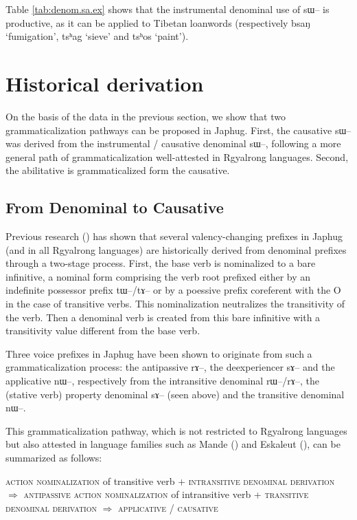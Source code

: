 \documentclass[oldfontcommands,oneside,a4paper,11pt]{article}
\newcommand{\ipa}[1]{{\phon \mbox{#1}}} %
\begin{document}
 Table \ref{tab:denom.sa.ex} shows that the instrumental   denominal use of \ipa{sɯ--} is productive, as it can be applied to Tibetan loanwords (respectively \ipa{bsaŋ} `fumigation', \ipa{tsʰag} `sieve' and \ipa{tsʰos} `paint').
 
 

\section{Historical derivation}
On the basis of the data in the previous section, we show that two grammaticalization pathways can be proposed in Japhug. First, the causative \ipa{sɯ--} was derived from the instrumental / causative denominal \ipa{sɯ--}, following a more general path of grammaticalization well-attested in Rgyalrong languages. Second, the abilitative is grammaticalized form the causative.

\subsection{From Denominal to Causative}
Previous research (\citealt{jacques14antipassive}) has shown that several valency-changing prefixes in Japhug (and in all Rgyalrong languages) are historically derived from denominal prefixes through a two-stage process. First, the base verb is nominalized to a bare infinitive, a nominal form comprising the verb root prefixed  either by an indefinite possessor prefix \ipa{tɯ--/tɤ--} or by a poessive prefix coreferent with the O in the case of transitive verbs. This nominalization neutralizes the transitivity of the verb. Then a denominal verb is created from this bare infinitive with a transitivity value different from the base verb. 

Three voice prefixes in Japhug have been shown to originate from such a grammaticalization process: the antipassive \ipa{rɤ--}, the deexperiencer \ipa{sɤ--} and the applicative \ipa{nɯ--}, respectively from the intransitive denominal \ipa{rɯ--/rɤ--}, the (stative verb) property denominal \ipa{sɤ--} (seen above) and the transitive denominal \ipa{nɯ--}.

This grammaticalization pathway, which is not restricted to Rgyalrong languages but also attested in language families such as Mande (\citealt{creissels12antip}) and Eskaleut (\citet{fortescue96halftrans}),  can be summarized as follows:


\begin{exe}
\ex \label{ex:pathway}
\glt \textsc{action nominalization} of transitive verb + \textsc{intransitive denominal derivation} $\Rightarrow$ \textsc{antipassive}
\ex
\glt \textsc{action nominalization} of intransitive verb + \textsc{transitive denominal derivation} $\Rightarrow$ \textsc{applicative} / \textsc{causative}
\end{exe}
\end{document}
